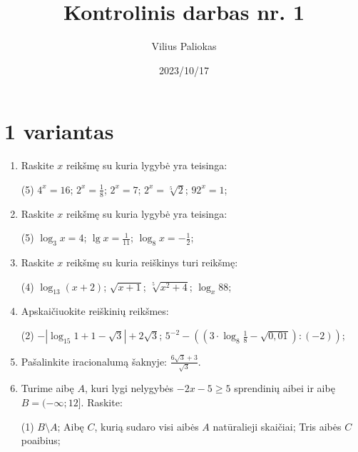 \documentclass[a4paper]{article}
\title{Kontrolinis darbas nr. 1}
\author{Vilius Paliokas}
\date{2023/10/17}
\begin{document}
\thispagestyle{empty}
\section*{1 variantas}

\begin{enumerate}
      \item Raskite $x$ reikšmę su kuria lygybė yra teisinga:

            \begin{tasks}[item-format={\normalfont}, after-item-skip=4mm](5)
                  \task $4^{x}=16$;
                  \task $2^{x}=\frac{1}{8}$;
                  \task $2^{x}=7$;
                  \task $2^{x}=\sqrt[5]{2}$;
                  \task $92^{x}=1$;
            \end{tasks}

      \item Raskite $x$  reikšmę su kuria lygybė yra teisinga:
            \begin{tasks}[item-format={\normalfont}, after-item-skip=4mm](5)
                  \task $\log_{3} x=4$;
                  \task $\lg x=\frac{1}{11}$;
                  \task $\log_{8} x=-\frac{1}{2}$;
            \end{tasks}
      \item Raskite $x$  reikšmę su kuria reiškinys turi reikšmę:
            \begin{tasks}[item-format={\normalfont}, after-item-skip=4mm](4)
                  \task $\log_{13} (x+2)$;
                  \task $\sqrt{x+1}$;
                  \task $\sqrt[5]{x^{2}+4}$;
                  \task $\log_{x}88$;
            \end{tasks}
      \item Apskaičiuokite reiškinių reikšmes:
            \begin{tasks}[item-format={\normalfont}, after-item-skip=4mm](2)
                  \task $-\left|\log_{15}1+1-\sqrt{3}\right|+2\sqrt{3}$;
                  \task $5^{-2} - ((3 \cdot \log_{8}\frac{1}{8}-\sqrt{0,01}):(-2))$;
            \end{tasks}

      \item Pašalinkite iracionalumą šaknyje: $\frac{6\sqrt{3}+3}{\sqrt{3}}$.

      \item Turime aibę $A$, kuri lygi nelygybės $-2x-5\geq5$ sprendinių aibei
            ir aibę $B=(-\infty;12]$. Raskite:
            \begin{tasks}[item-format={\normalfont}, after-item-skip=2mm](1)
                  \task $B \setminus A$;
                  \task Aibę $C$, kurią sudaro visi aibės $A$ natūralieji skaičiai;
                  \task Tris aibės $C$ poaibius;
            \end{tasks}
\end{enumerate}
\end{document}
